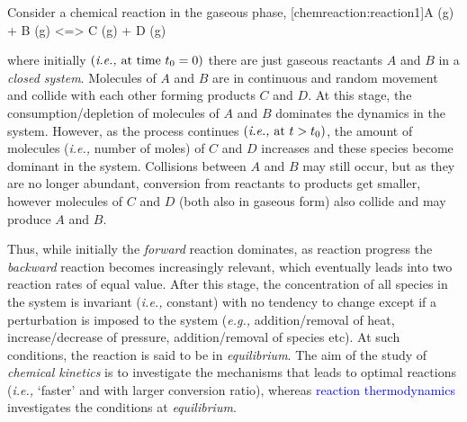 \documentclass[12pts,a4paper,amsmath,amssymb,floatfix]{article}%
\makeatletter
\newcommand{\blue}{\textcolor{blue}}
\newcommand{\eg}{{\it e.g., }}
\newcommand{\ie}{{\it i.e., }}
\newcounter{reaction}
\renewcommand\thereaction{R6.\,\arabic{reaction}}
\newcommand\reactiontag{\refstepcounter{reaction}\tag{\thereaction}}
\newcommand\reaction@[2][]{\begin{equation}\ce{#2}%
\ifx\@empty#1\@empty\else\label{#1}\fi%
\reactiontag\end{equation}}
\newcommand\reaction@nonumber[1]{\begin{equation*}\ce{#1}%
\end{equation*}}
\newcommand\reaction{\@ifstar{\reaction@nonumber}{\reaction@}}
\makeatother
\begin{document}
Consider a chemical reaction in the gaseous phase,
     \reaction[chemreaction:reaction1]{A (g) + B (g) <=> C (g) + D (g)}

\noindent where initially $\left(\text{\ie at time } t_{0}=0\right)$ there are just gaseous reactants $A$ and $B$ in a {\it closed system}. Molecules of $A$ and $B$ are in continuous and random movement and collide with each other forming products $C$ and $D$. At this stage, the consumption/depletion of molecules of $A$ and $B$ dominates the dynamics in the system. However, as the process continues $\left(\text{\ie at } t > t_{0}\right)$, the amount of molecules (\ie number of moles) of $C$ and $D$ increases and these species become dominant in the system. Collisions between $A$ and $B$ may still occur, but as they are no longer abundant, conversion from reactants to products get smaller, however molecules of $C$ and $D$ (both also in gaseous form) also collide and may produce $A$ and $B$. 

Thus, while initially the {\it forward} reaction dominates, as reaction progress the {\it backward} reaction becomes increasingly relevant, which eventually leads into two reaction rates of equal value. After this stage, the concentration of all species in the system is invariant (\ie constant) with no tendency to change except if a perturbation is imposed to the system (\eg addition/removal of heat, increase/decrease of pressure, addition/removal of species etc). At such conditions, the reaction is said to be in {\it equilibrium}. The aim of the study of {\it chemical kinetics} is to investigate the mechanisms that leads to optimal reactions (\ie `faster' and with larger conversion ratio), whereas \blue{reaction thermodynamics} investigates the conditions at {\it equilibrium}.
\end{document}
